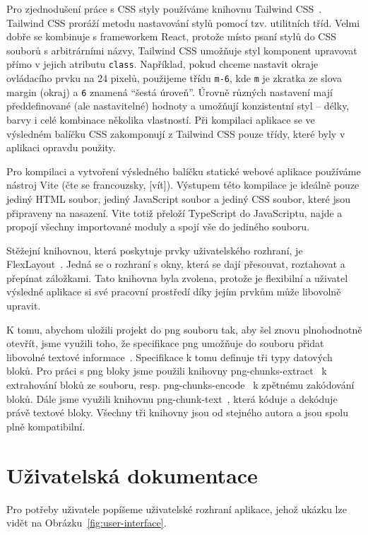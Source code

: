 Pro zjednodušení práce s CSS styly používáme knihovnu Tailwind CSS~\cite{tailwindlabs_tailwindcss_2020}.
Tailwind CSS proráží metodu nastavování stylů pomocí tzv. utilitních tříd.
Velmi dobře se kombinuje s frameworkem React, protože místo psaní stylů do CSS souborů s arbitrárními názvy, Tailwind CSS umožňuje styl komponent upravovat přímo v jejich atributu \texttt{class}.
Například, pokud chceme nastavit okraje ovládacího prvku na 24 pixelů, použijeme třídu \texttt{m-6}, kde \texttt{m} je zkratka ze slova margin (okraj) a \texttt{6} znamená \enquote{šestá úroveň}.
Úrovně různých nastavení mají předdefinované (ale nastavitelné) hodnoty a umožňují konzistentní styl -- délky, barvy i celé kombinace několika vlastností.
Při kompilaci aplikace se ve výsledném balíčku CSS zakomponují z Tailwind CSS pouze třídy, které byly v aplikaci opravdu použity.

Pro kompilaci a vytvoření výsledného balíčku statické webové aplikace používáme nástroj Vite (čte se francouzsky, [vít]).
Výstupem této kompilace je ideálně pouze jediný HTML soubor, jediný JavaScript soubor a jediný CSS soubor, které jsou připraveny na nasazení.
Vite totiž přeloží TypeScript do JavaScriptu, najde a propojí všechny importované moduly a spojí vše do jediného souboru.

Stěžejní knihovnou, která poskytuje prvky uživatelského rozhraní, je FlexLayout~\cite{_flexlayout_2015}.
Jedná se o rozhraní s okny, která se dají přesouvat, roztahovat a přepínat záložkami.
Tato knihovna byla zvolena, protože je flexibilní a uživatel výsledné aplikace si své pracovní prostředí díky jejím prvkům může libovolně upravit.

K tomu, abychom uložili projekt do \acrshort{png} souboru tak, aby šel znovu plnohodnotně otevřít, jsme využili toho, že specifikace \acrshort{png} umožňuje do souboru přidat libovolné textové informace~\cite[sekce 11.3.4]{w3c_portablenetwork_2003}.
Specifikace k tomu definuje tři typy datových bloků.
Pro práci s \acrshort{png} bloky jsme použili knihovny png-chunks-extract~\cite{kennedy_pngchunksextract_2015} k extrahování bloků ze souboru, resp. png-chunks-encode~\cite{kennedy_pngchunksencode_2015} k zpětnému zakódování bloků.
Dále jsme využili knihovnu png-chunk-text~\cite{kennedy_pngchunktext_2015}, která kóduje a dekóduje právě textové bloky.
Všechny tři knihovny jsou od stejného autora a jsou spolu plně kompatibilní.

\section{Uživatelská dokumentace}
Pro potřeby uživatele popíšeme uživatelské rozhraní aplikace, jehož ukázku lze vidět na Obrázku~\ref{fig:user-interface}.

